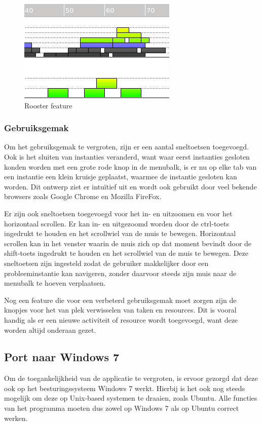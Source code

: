 \begin{figure}[H]
\center
\includegraphics[width=.5\textwidth]{../images/rooster.png}
\caption{Rooster feature}
\label{fig:rooster}
\end{figure}

\subsubsection*{Gebruiksgemak}
Om het gebruiksgemak te vergroten, zijn er een aantal sneltoetsen toegevoegd. Ook is het sluiten van instanties veranderd, want waar eerst instanties gesloten konden worden met een grote rode knop in de menubalk, is er nu op elke tab van een instantie een klein kruisje geplaatst, waarmee de instantie gesloten kan worden. Dit ontwerp ziet er intu\"itief uit en wordt ook gebruikt door veel bekende browsers zoals Google Chrome en Mozilla FireFox.

Er zijn ook sneltoetsen toegevoegd voor het in- en uitzoomen en voor het horizontaal scrollen. Er kan in- en uitgezoomd worden door de ctrl-toets ingedrukt te houden en het scrollwiel van de muis  te bewegen. Horizontaal scrollen kan in het venster waarin de muis zich op dat moment bevindt door de shift-toets ingedrukt te houden en het scrollwiel van de muis te bewegen. Deze sneltoetsen zijn ingesteld zodat de gebruiker makkelijker door een probleeminstantie kan navigeren, zonder daarvoor steeds zijn muis naar de menubalk te hoeven verplaatsen.

Nog een feature die voor een verbeterd gebruiksgemak moet zorgen zijn de knopjes voor het van plek verwisselen van taken en resources. Dit is vooral handig als er een nieuwe activiteit of resource wordt toegevoegd, want deze worden altijd onderaan gezet. 

\subsection{Port naar Windows 7}
Om de toegankelijkheid van de applicatie te vergroten, is ervoor gezorgd dat deze ook op het besturingssysteem Windows 7 werkt. Hierbij is het ook nog steeds mogelijk om deze op Unix-based systemen te draaien, zoals Ubuntu. Alle functies van het programma moeten dus zowel op Windows 7 als op Ubuntu correct werken.

